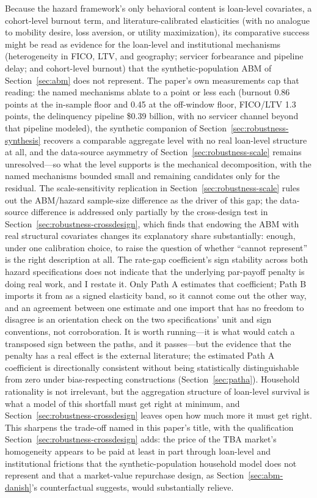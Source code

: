 \documentclass[12pt]{article}
\begin{document}
Because the hazard framework's only behavioral content is loan-level covariates, a cohort-level burnout term, and literature-calibrated elasticities (with no analogue to mobility desire, loss aversion, or utility maximization), its comparative success might be read as evidence for the loan-level and institutional mechanisms (heterogeneity in FICO, LTV, and geography; servicer forbearance and pipeline delay; and cohort-level burnout) that the synthetic-population ABM of Section~\ref{sec:abm} does not represent. The paper's own measurements cap that reading: the named mechanisms ablate to a point or less each (burnout 0.86 points at the in-sample floor and 0.45 at the off-window floor, FICO/LTV 1.3 points, the delinquency pipeline \$0.39 billion, with no servicer channel beyond that pipeline modeled), the synthetic companion of Section~\ref{sec:robustness-synthesis} recovers a comparable aggregate level with no real loan-level structure at all, and the data-source asymmetry of Section~\ref{sec:robustness-scale} remains unresolved---so what the level supports is the mechanical decomposition, with the named mechanisms bounded small and remaining candidates only for the residual. The scale-sensitivity replication in Section~\ref{sec:robustness-scale} rules out the ABM/hazard sample-size difference as the driver of this gap; the data-source difference is addressed only partially by the cross-design test in Section~\ref{sec:robustness-crossdesign}, which finds that endowing the ABM with real structural covariates changes its explanatory share substantially: enough, under one calibration choice, to raise the question of whether ``cannot represent'' is the right description at all. The rate-gap coefficient's sign stability across both hazard specifications does not indicate that the underlying par-payoff penalty is doing real work, and I restate it. Only Path A estimates that coefficient; Path B imports it from \citet{liebersohn2024} as a signed elasticity band, so it cannot come out the other way, and an agreement between one estimate and one import that has no freedom to disagree is an orientation check on the two specifications' unit and sign conventions, not corroboration. It is worth running---it is what would catch a transposed sign between the paths, and it passes---but the evidence that the penalty has a real effect is the external literature; the estimated Path A coefficient is directionally consistent without being statistically distinguishable from zero under bias-respecting constructions (Section~\ref{sec:patha}). Household rationality is not irrelevant, but the aggregation structure of loan-level survival is what a model of this shortfall must get right at minimum, and Section~\ref{sec:robustness-crossdesign} leaves open how much more it must get right. This sharpens the trade-off named in this paper's title, with the qualification Section~\ref{sec:robustness-crossdesign} adds: the price of the TBA market's homogeneity appears to be paid at least in part through loan-level and institutional frictions that the synthetic-population household model does not represent and that a market-value repurchase design, as Section~\ref{sec:abm-danish}'s counterfactual suggests, would substantially relieve.
\end{document}
